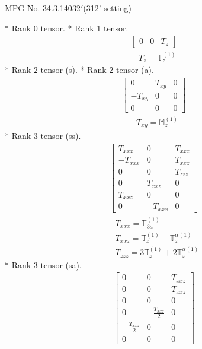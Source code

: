 \documentclass[fleqn,8pt,landscape]{jsarticle}
\begin{document}
\setcounter{MaxMatrixCols}{32}

\renewcommand{\tablename}{Table~}
\renewcommand{\figurename}{Figure~}
\begin{center}
\LARGE
MPG No. 34.3.140\quad$32'$\quad(312' setting)
\end{center}
* Rank 0 tensor.
* Rank 1 tensor.
\begin{align*}
\begin{bmatrix} 0 & 0 & T_{z} \end{bmatrix}
\end{align*}
\begin{align*}
& T_{z} = \mathbb{T}_{z}^{(1)}
\end{align*}
* Rank 2 tensor (s).
* Rank 2 tensor (a).
\begin{align*}
\begin{bmatrix} 0 & T_{xy} & 0 \\ - T_{xy} & 0 & 0 \\ 0 & 0 & 0 \end{bmatrix}
\end{align*}
\begin{align*}
& T_{xy} = \mathbb{M}_{z}^{(1)}
\end{align*}
* Rank 3 tensor (ss).
\begin{align*}
\begin{bmatrix} T_{xxx} & 0 & T_{xxz} \\ - T_{xxx} & 0 & T_{xxz} \\ 0 & 0 & T_{zzz} \\ 0 & T_{xxz} & 0 \\ T_{xxz} & 0 & 0 \\ 0 & - T_{xxx} & 0 \end{bmatrix}
\end{align*}
\begin{align*}
& T_{xxx} = \mathbb{T}_{3a}^{(1)} \\
& T_{xxz} = \mathbb{T}_{z}^{(1)} - \mathbb{T}_{z}^{\alpha(1)} \\
& T_{zzz} = 3 \mathbb{T}_{z}^{(1)} + 2 \mathbb{T}_{z}^{\alpha(1)}
\end{align*}
* Rank 3 tensor (sa).
\begin{align*}
\begin{bmatrix} 0 & 0 & T_{xxz} \\ 0 & 0 & T_{xxz} \\ 0 & 0 & 0 \\ 0 & - \frac{T_{xxz}}{2} & 0 \\ - \frac{T_{xxz}}{2} & 0 & 0 \\ 0 & 0 & 0 \end{bmatrix}
\end{align*}
\end{document}
